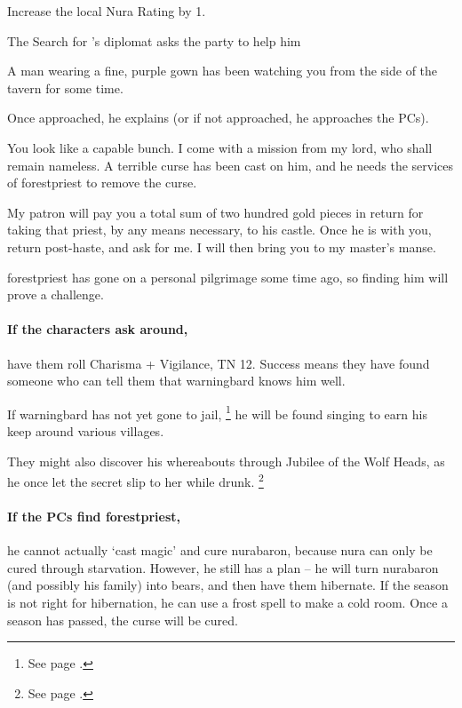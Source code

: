 \begin{multicols}{2}
Increase the local Nura Rating by 1.

\resumecontents[Town]

{The Search for }%
{'s diplomat asks the party to help him}%
\label{nonstarter}

\stopcontents[Town]

\begin{boxtext}

  A man wearing a fine, purple gown has been watching you from the side of the tavern for some time.

\end{boxtext}

Once approached, he explains (or if not approached, he approaches the PCs).

\begin{speechtext}

  You look like a capable bunch.
  I come with a mission from my lord, who shall remain nameless.
  A terrible curse has been cast on him, and he needs the services of \gls{forestpriest} to remove the curse.

  My patron will pay you a total sum of two hundred gold pieces in return for taking that priest, by any means necessary, to his castle.
  Once he is with you, return post-haste, and ask for me.
  I will then bring you to my master's manse.

\end{speechtext}

\Gls{forestpriest} has gone on a personal pilgrimage some time ago, so finding him will prove a challenge.

\paragraph{If the characters ask around,}
have them roll Charisma + Vigilance, TN 12.
Success means they have found someone who can tell them that \gls{warningbard} knows him well.

If \gls{warningbard} has not yet gone to jail,%
\footnote{See page \pageref{warningbard}.}
he will be found singing to earn his keep around various villages.

They might also discover his whereabouts through Jubilee of the Wolf Heads, as he once let the secret slip to her while drunk.%
\footnote{See page \pageref{jubilee}.}

\paragraph{If the PCs find \gls{forestpriest},}
he cannot actually `cast magic' and cure \gls{nurabaron}, because nura can only be cured through starvation.
However, he still has a plan -- he will turn \gls{nurabaron} (and possibly his family) into bears, and then have them hibernate.
If the season is not right for hibernation, he can use a frost spell to make a cold room.
Once a season has passed, the curse will be cured.


\end{multicols}
